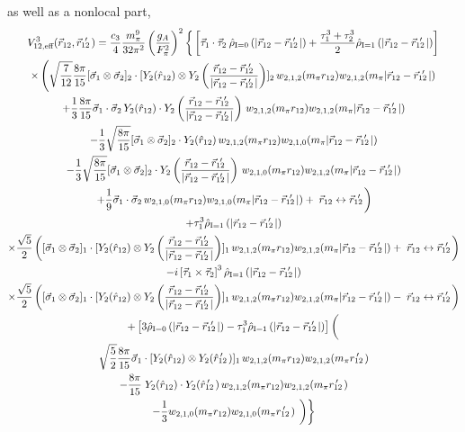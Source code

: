 as well as a nonlocal part,
\begin{multline}
V^{3}_{12,\text{eff}}(\rot,\rotp)=\frac{c_3 }{4}\frac{m_\pi^9}{32\pi^2}\left(\frac{g_A}{F_\pi^2}\right)^2 \left\{\fracphantom\left[\taudot \:\rhohat{0}{|\rot-\rotp|} +\tauplusthree \rhohat{1}{|\rot-\rotp|} \right]\right. \\
%
\times\left(\sqrt{\frac{7}{12}}\frac{8\pi}{15}\sigmatwo\cdot  [ Y_2(\hat{r}_{12})\otimes Y_2 \left(\frac{\rot-\rotp}{|\rot-\rotp|}\right) ]_2\, \w{2}{1}{2}{m_\pi r_{12}}\w{2}{1}{2}{m_\pi |\rot-\rotp|} 
\right.\\ 
%
+\frac{1}{3}\frac{8\pi}{15}\sigmadot \, Y_2(\hat{r}_{12})\cdot Y_2 \left(\frac{\rot-\rotp}{|\rot-\rotp|}\right)  \,\w{2}{1}{2}{m_\pi r_{12}}\w{2}{1}{2}{m_\pi |\rot-\rotp|} \\
%
-\frac{1}{3}\sqrt{\frac{8\pi}{15}}\sigmatwo \cdot Y_2(\hat{r}_{12}) \,\w{2}{1}{2}{m_\pi r_{12}}\w{2}{1}{0}{m_\pi |\rot-\rotp|} \\
-\frac{1}{3}\sqrt{\frac{8\pi}{15}}\sigmatwo \cdot Y_2 \left(\frac{\rot-\rotp}{|\rot-\rotp|}\right) \,\w{2}{1}{0}{m_\pi r_{12}}\w{2}{1}{2}{m_\pi |\rot-\rotp|} \\
\left.+\frac{1}{9}\sigmadot \, \w{2}{1}{0}{m_\pi r_{12}}\w{2}{1}{0}{m_\pi |\rot-\rotp|}+\; \rot \leftrightarrow \rotp \fracphantom\right) \\
%
%
+\tau_1^3 \rhohat{1}{|\rot-\rotp|} \\
\times\frac{\sqrt{5}}{2}\left(\fracphantom  \sigmaone \cdot  [ Y_2(\hat{r}_{12})\otimes Y_2 \left(\frac{\rot-\rotp}{|\rot-\rotp|}\right) ]_1  \,\w{2}{1}{2}{m_\pi r_{12}}\w{2}{1}{2}{m_\pi |\rot - \rotp|} + \; \rot \leftrightarrow \rotp \fracphantom\right)\\
%
-i\taucrossthree \rhohat{1}{|\rot-\rotp|} \\
\times\frac{\sqrt{5}}{2}\left(\fracphantom \sigmaone \cdot  [ Y_2(\hat{r}_{12})\otimes Y_2 \left(\frac{\rot-\rotp}{|\rot-\rotp|}\right) ]_1  \,\w{2}{1}{2}{m_\pi r_{12}}\w{2}{1}{2}{m_\pi |\rot-\rotp|} - \; \rot \leftrightarrow \rotp \fracphantom\right) \\
%
%
+\left[3\rhohat{0}{|\rot-\rotp|}-\tau_1^3 \rhohat{1}{|\rot-\rotp|}\right]\left( \fracphantom\right. \\
\sqrt{\frac{5}{2}}\frac{8\pi}{15}  \vec{\sigma}_1 \cdot [Y_2 (\hat{r}_{12}) \otimes Y_2(\rotphat)]_1 \,\w{2}{1}{2}{m_\pi r_{12}} \w{2}{1}{2}{m_\pi\rotpr}  \\
-\frac{8\pi}{15}\;Y_2 (\hat{r}_{12}) \cdot Y_2(\rotphat) \,\w{2}{1}{2}{m_\pi r_{12}} \w{2}{1}{2}{m_\pi\rotpr} \\
%
-\frac{1}{3} \w{2}{1}{0}{m_\pi r_{12}} \w{2}{1}{0}{m_\pi\rotpr} \left. \left.\fracphantom\right)\right\}
\end{multline}

